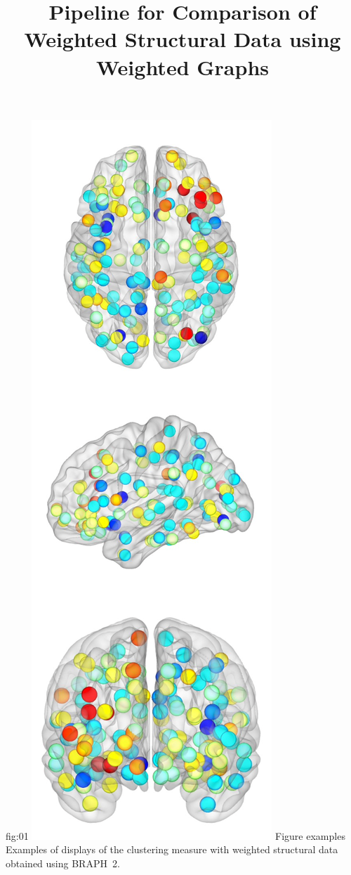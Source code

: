 \documentclass[justified]{tufte-handout}
\title[Comparison of Structural Data using WU]{Pipeline for Comparison of Weighted Structural Data using Weighted Graphs}
\begin{document}
\maketitle

	{fig:01}
	{\includegraphics{fig01.png}}
	{Figure examples}
	{
	Examples of displays of the clustering measure with weighted structural data obtained using BRAPH~2.
	}
 
\end{document}
